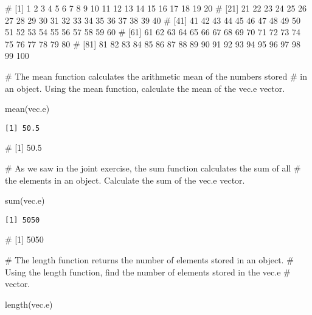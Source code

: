 \documentclass[
  letterpaper,
  DIV=11,
  numbers=noendperiod]{scrartcl}
\newenvironment{Shaded}{\begin{snugshade}}{\end{snugshade}}
\newcommand{\CommentTok}[1]{\textcolor[rgb]{0.37,0.37,0.37}{#1}}
\newcommand{\FunctionTok}[1]{\textcolor[rgb]{0.28,0.35,0.67}{#1}}
\newcommand{\NormalTok}[1]{\textcolor[rgb]{0.00,0.23,0.31}{#1}}
\begin{document}
\begin{Shaded}
\begin{Highlighting}[]
\CommentTok{\# [1]   1   2   3   4   5   6   7   8   9  10  11  12  13  14  15  16  17  18  19  20}
\CommentTok{\# [21]  21  22  23  24  25  26  27  28  29  30  31  32  33  34  35  36  37  38  39  40}
\CommentTok{\# [41]  41  42  43  44  45  46  47  48  49  50  51  52  53  54  55  56  57  58  59  60}
\CommentTok{\# [61]  61  62  63  64  65  66  67  68  69  70  71  72  73  74  75  76  77  78  79  80}
\CommentTok{\# [81]  81  82  83  84  85  86  87  88  89  90  91  92  93  94  95  96  97  98  99 100}

\CommentTok{\# The mean function calculates the arithmetic mean of the numbers stored }
\CommentTok{\# in an object. Using the mean function, calculate the mean of the vec.e vector.}


\FunctionTok{mean}\NormalTok{(vec.e)}
\end{Highlighting}
\end{Shaded}

\begin{verbatim}
[1] 50.5
\end{verbatim}

\begin{Shaded}
\begin{Highlighting}[]
\CommentTok{\# [1] 50.5}

\CommentTok{\# As we saw in the joint exercise, the sum function calculates the sum of all }
\CommentTok{\# the elements in an object. Calculate the sum of the vec.e vector. }


\FunctionTok{sum}\NormalTok{(vec.e)}
\end{Highlighting}
\end{Shaded}

\begin{verbatim}
[1] 5050
\end{verbatim}

\begin{Shaded}
\begin{Highlighting}[]
\CommentTok{\# [1] 5050}

\CommentTok{\# The length function returns the number of elements stored in an object. }
\CommentTok{\# Using the length function, find the number of elements stored in the vec.e}
\CommentTok{\# vector. }


\FunctionTok{length}\NormalTok{(vec.e)}
\end{Highlighting}
\end{Shaded}
\end{document}
